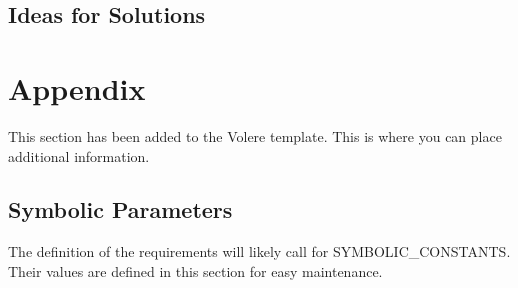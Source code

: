 \documentclass[12pt, titlepage]{article}
\begin{document}
\subsection{Ideas for Solutions}





\newpage

\section{Appendix}

This section has been added to the Volere template.  This is where you can place
additional information.

\subsection{Symbolic Parameters}

The definition of the requirements will likely call for SYMBOLIC\_CONSTANTS.
Their values are defined in this section for easy maintenance.
\end{document}
